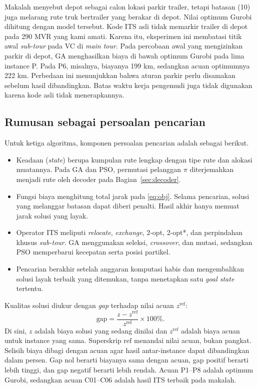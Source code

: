 \documentclass[conference]{IEEEtran}
\begin{document}
Makalah menyebut depot sebagai calon lokasi parkir trailer, tetapi batasan (10) juga melarang rute truk bertrailer yang berakar di depot. Nilai optimum Gurobi dihitung dengan model tersebut. Kode ITS asli tidak memarkir trailer di depot pada 290 MVR yang kami amati. Karena itu, eksperimen ini membatasi titik awal \textit{sub-tour} pada VC di \textit{main tour}. Pada percobaan awal yang mengizinkan parkir di depot, GA menghasilkan biaya di bawah optimum Gurobi pada lima instance P. Pada P6, misalnya, biayanya 199 km, sedangkan acuan optimumnya 222 km. Perbedaan ini menunjukkan bahwa aturan parkir perlu disamakan sebelum hasil dibandingkan. Batas waktu kerja pengemudi juga tidak digunakan karena kode asli tidak menerapkannya.

\subsection{Rumusan sebagai persoalan pencarian}

Untuk ketiga algoritma, komponen persoalan pencarian adalah sebagai berikut.
\begin{itemize}
\item Keadaan (\textit{state}) berupa kumpulan rute lengkap dengan tipe rute dan alokasi muatannya. Pada GA dan PSO, permutasi pelanggan $\pi$ diterjemahkan menjadi rute oleh decoder pada Bagian~\ref{sec:decoder}.
\item Fungsi biaya menghitung total jarak pada \eqref{eq:obj}. Selama pencarian, solusi yang melanggar batasan dapat diberi penalti. Hasil akhir hanya memuat jarak solusi yang layak.
\item Operator ITS meliputi \textit{relocate}, \textit{exchange}, 2-opt, 2-opt*, dan perpindahan khusus \textit{sub-tour}. GA menggunakan seleksi, \textit{crossover}, dan mutasi, sedangkan PSO memperbarui kecepatan serta posisi partikel.
\item Pencarian berakhir setelah anggaran komputasi habis dan mengembalikan solusi layak terbaik yang ditemukan, tanpa menetapkan satu \textit{goal state} tertentu.
\end{itemize}

Kualitas solusi diukur dengan \textit{gap} terhadap nilai acuan $z^{\text{ref}}$:
\begin{equation}
\text{gap} = \frac{z - z^{\text{ref}}}{z^{\text{ref}}}\times 100\%.\label{eq:gap}
\end{equation}
Di sini, $z$ adalah biaya solusi yang sedang dinilai dan $z^{\text{ref}}$ adalah biaya acuan untuk instance yang sama. Superskrip $\text{ref}$ menandai nilai acuan, bukan pangkat. Selisih biaya dibagi dengan acuan agar hasil antar-instance dapat dibandingkan dalam persen. Gap nol berarti biayanya sama dengan acuan, gap positif berarti lebih tinggi, dan gap negatif berarti lebih rendah. Acuan P1--P8 adalah optimum Gurobi, sedangkan acuan C01--C06 adalah hasil ITS terbaik pada makalah.
\end{document}
